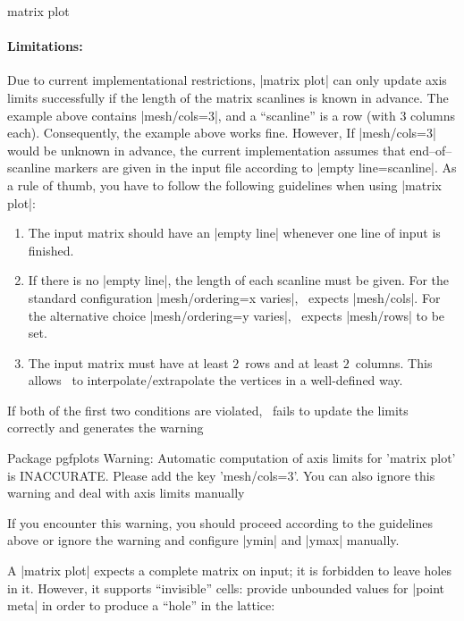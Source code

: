 {\begin{plottype}[/pgfplots]{matrix plot}
	\paragraph{Limitations: } Due to current implementational restrictions, |matrix plot| can only update axis limits successfully if the length of the matrix scanlines is known in advance. The example above contains |mesh/cols=3|, and a ``scanline'' is a row (with $3$ columns each). Consequently, the example above works fine. However, If |mesh/cols=3| would be unknown in advance, the current implementation assumes that end--of--scanline markers are given in the input file according to |empty line=scanline|. As a rule of thumb, you have to follow the following guidelines when using |matrix plot|:
	\begin{enumerate}
		\item The input matrix should have an |empty line| whenever one line of input is finished.
		\item If there is no |empty line|, the length of each scanline must be given. For the standard configuration |mesh/ordering=x varies|, \PGFPlots\ expects |mesh/cols|. For the alternative choice |mesh/ordering=y varies|, \PGFPlots\ expects |mesh/rows| to be set.
		\item The input matrix must have at least $2$~rows and at least $2$~columns. This allows \PGFPlots\ to interpolate/extrapolate the vertices in a well-defined way.
	\end{enumerate}
	If both of the first two conditions are violated, \PGFPlots\ fails to update the limits correctly and generates the warning 
\begin{codeexample}
Package pgfplots Warning: Automatic computation of axis limits for 'matrix plot' is INACCURATE. 
Please add the key 'mesh/cols=3'. You can also ignore this warning and deal with axis limits manually
\end{codeexample}
If you encounter this warning, you should proceed according to the guidelines above or ignore the warning and configure |ymin| and |ymax| manually.

	A |matrix plot| expects a complete matrix on input; it is forbidden to leave holes in it. However, it supports ``invisible'' cells: provide unbounded values for |point meta| in order to produce a ``hole'' in the lattice:
\begin{codeexample}[]
\begin{tikzpicture}
\begin{axis}[enlargelimits=false,colorbar]


\end{axis}
\end{tikzpicture}
\end{codeexample}
\end{plottype}}
